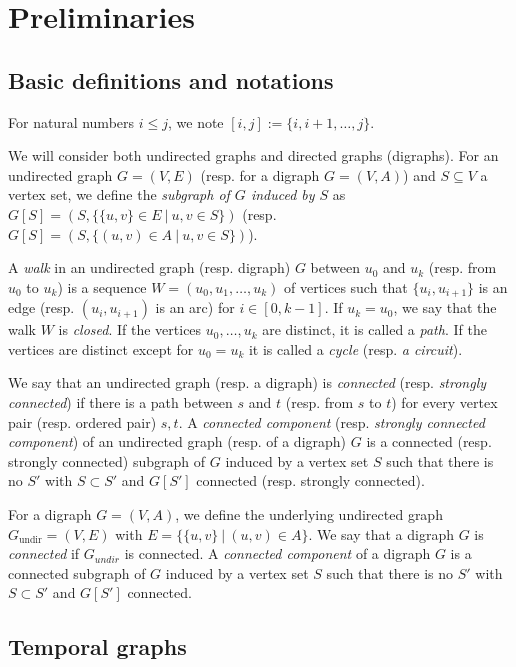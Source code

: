 \documentclass[11pt]{article}%
\begin{document}
\section{Preliminaries}
\label{sec:preliminaries}

\subsection{Basic definitions and notations}

For natural numbers $i\leq j$, we note $[i,j]:=\{i,i+1,\dots,j\}$.


We will consider both undirected graphs and directed graphs (digraphs).  For an undirected graph $G=(V,E)$  (resp. for a digraph $G=(V,A)$) and $S\subseteq V$ a vertex set, we define the {\it subgraph of $G$ induced by $S$} as $G[S]=(S, \{\{u,v\}\in E\:|\: u,v\in S\})$ (resp. $G[S]=(S, \{(u,v)\in A\:|\: u,v\in S\})$). 

A {\it walk} in an undirected graph (resp. digraph) $G$  between $u_0$ and $u_k$ (resp. from $u_0$ to $u_k$) is a sequence $W=(u_0,u_1,\dots,u_k)$ of vertices such that $\{u_i,u_{i+1}\}$ is an edge (resp. $(u_i,u_{i+1})$ is an arc) for $i\in [0,k-1]$. If $u_k=u_0$, we say that the walk $W$ is {\it closed}. If the vertices $u_0,\dots,u_k$ are distinct, it is called a {\it path}. If the vertices are distinct except for $u_0=u_k$ it is called a {\it cycle} (resp. {\it a circuit}).

We say that an undirected graph (resp. a digraph) is {\it connected} (resp. {\it strongly connected}) if there is a path between $s$ and $t$ (resp. from $s$ to $t$) for every vertex pair (resp. ordered pair) $s,t$.
A {\it connected component} (resp. {\it strongly connected component}) of an undirected graph (resp. of a digraph) $G$ is a connected (resp. strongly connected) subgraph of $G$ induced by a vertex set $S$ such that there is no $S'$ with $S\subset S'$ and $G[S']$ connected (resp. strongly connected).

For a digraph $G=(V,A)$, we define the underlying undirected graph $G_{\text{undir}}=(V,E)$ with $E=\{\{u,v\}\:|\:(u,v)\in A\}$. We say that a digraph $G$ is {\it connected} if $G_{undir}$ is connected. A {\it connected component} of a digraph $G$ is a connected subgraph of $G$ induced by a vertex set $S$ such that there is no $S'$ with $S\subset S'$ and $G[S']$ connected. 

\subsection{Temporal graphs}
\end{document}
